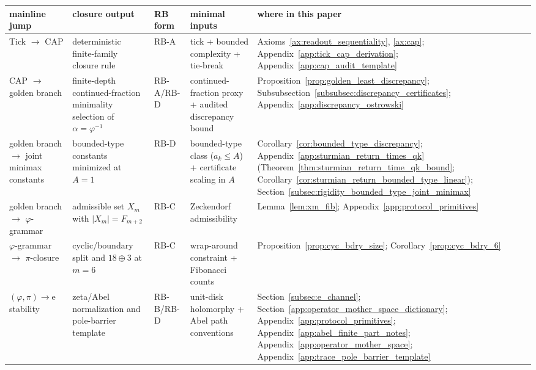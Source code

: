 \begin{center}
\scriptsize
\setlength{\tabcolsep}{6pt}
\renewcommand{\arraystretch}{1.2}
\begin{tabular}{p{} p{} p{} p{} p{}}
\toprule
mainline jump & closure output & RB form & minimal inputs & where in this paper \\
\midrule
Tick $\to$ CAP &
deterministic finite-family closure rule &
RB-A &
tick + bounded complexity + tie-break &
Axioms~\ref{ax:readout_sequentiality}, \ref{ax:cap}; Appendix~\ref{app:tick_cap_derivation}; Appendix~\ref{app:cap_audit_template} \\

CAP $\to$ golden branch &
finite-depth continued-fraction minimality selection of $\alpha=\varphi^{-1}$ &
RB-A/RB-D &
continued-fraction proxy + audited discrepancy bound &
Proposition~\ref{prop:golden_least_discrepancy}; Subsubsection~\ref{subsubsec:discrepancy_certificates}; Appendix~\ref{app:discrepancy_ostrowski} \\

\addlinespace
golden branch $\to$ joint minimax constants &
bounded-type constants minimized at $A=1$ &
RB-D &
bounded-type class ($a_k\le A$) + certificate scaling in $A$ &
Corollary~\ref{cor:bounded_type_discrepancy}; Appendix~\ref{app:sturmian_return_times_qk} (Theorem~\ref{thm:sturmian_return_time_qk_bound}; Corollary~\ref{cor:sturmian_return_bounded_type_linear}); Section~\ref{subsec:rigidity_bounded_type_joint_minimax} \\

golden branch $\to$ $\varphi$-grammar &
admissible set $X_m$ with $|X_m|=F_{m+2}$ &
RB-C &
Zeckendorf admissibility &
Lemma~\ref{lem:xm_fib}; Appendix~\ref{app:protocol_primitives} \\

$\varphi$-grammar $\to$ $\pi$-closure &
cyclic/boundary split and $18\oplus 3$ at $m=6$ &
RB-C &
wrap-around constraint + Fibonacci counts &
Proposition~\ref{prop:cyc_bdry_size}; Corollary~\ref{prop:cyc_bdry_6} \\

$(\varphi,\pi)\to \mathrm{e}$ stability &
zeta/Abel normalization and pole-barrier template &
RB-B/RB-D &
unit-disk holomorphy + Abel path conventions &
Section~\ref{subsec:e_channel}; Section~\ref{app:operator_mother_space_dictionary}; Appendix~\ref{app:protocol_primitives}; Appendix~\ref{app:abel_finite_part_notes}; Appendix~\ref{app:operator_mother_space}; Appendix~\ref{app:trace_pole_barrier_template} \\


\end{tabular}
\end{center}
